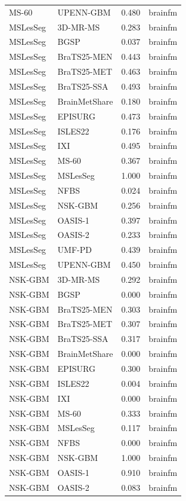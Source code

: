 \begin{tabular}{llrl}
MS-60 & UPENN-GBM & 0.480 & brainfm \\
MSLesSeg & 3D-MR-MS & 0.283 & brainfm \\
MSLesSeg & BGSP & 0.037 & brainfm \\
MSLesSeg & BraTS25-MEN & 0.443 & brainfm \\
MSLesSeg & BraTS25-MET & 0.463 & brainfm \\
MSLesSeg & BraTS25-SSA & 0.493 & brainfm \\
MSLesSeg & BrainMetShare & 0.180 & brainfm \\
MSLesSeg & EPISURG & 0.473 & brainfm \\
MSLesSeg & ISLES22 & 0.176 & brainfm \\
MSLesSeg & IXI & 0.495 & brainfm \\
MSLesSeg & MS-60 & 0.367 & brainfm \\
MSLesSeg & MSLesSeg & 1.000 & brainfm \\
MSLesSeg & NFBS & 0.024 & brainfm \\
MSLesSeg & NSK-GBM & 0.256 & brainfm \\
MSLesSeg & OASIS-1 & 0.397 & brainfm \\
MSLesSeg & OASIS-2 & 0.233 & brainfm \\
MSLesSeg & UMF-PD & 0.439 & brainfm \\
MSLesSeg & UPENN-GBM & 0.450 & brainfm \\
NSK-GBM & 3D-MR-MS & 0.292 & brainfm \\
NSK-GBM & BGSP & 0.000 & brainfm \\
NSK-GBM & BraTS25-MEN & 0.303 & brainfm \\
NSK-GBM & BraTS25-MET & 0.307 & brainfm \\
NSK-GBM & BraTS25-SSA & 0.317 & brainfm \\
NSK-GBM & BrainMetShare & 0.000 & brainfm \\
NSK-GBM & EPISURG & 0.300 & brainfm \\
NSK-GBM & ISLES22 & 0.004 & brainfm \\
NSK-GBM & IXI & 0.000 & brainfm \\
NSK-GBM & MS-60 & 0.333 & brainfm \\
NSK-GBM & MSLesSeg & 0.117 & brainfm \\
NSK-GBM & NFBS & 0.000 & brainfm \\
NSK-GBM & NSK-GBM & 1.000 & brainfm \\
NSK-GBM & OASIS-1 & 0.910 & brainfm \\
NSK-GBM & OASIS-2 & 0.083 & brainfm \\

\end{tabular}
